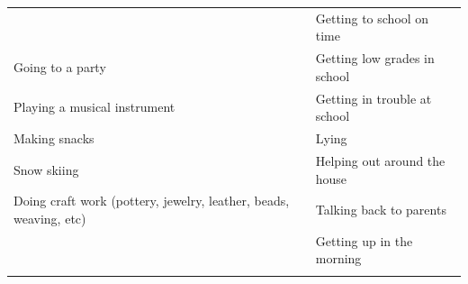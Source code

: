 \documentclass[]{book}
\begin{document}
\begin{longtable}[]{@{}ll@{}}
\begin{minipage}[t]{0.50\columnwidth}
\end{minipage} & \begin{minipage}[t]{0.44\columnwidth}\raggedright
Getting to school on time\strut
\end{minipage}\tabularnewline
\begin{minipage}[t]{0.50\columnwidth}\raggedright
Going to a party\strut
\end{minipage} & \begin{minipage}[t]{0.44\columnwidth}\raggedright
Getting low grades in school\strut
\end{minipage}\tabularnewline
\begin{minipage}[t]{0.50\columnwidth}\raggedright
Playing a musical instrument\strut
\end{minipage} & \begin{minipage}[t]{0.44\columnwidth}\raggedright
Getting in trouble at school\strut
\end{minipage}\tabularnewline
\begin{minipage}[t]{0.50\columnwidth}\raggedright
Making snacks\strut
\end{minipage} & \begin{minipage}[t]{0.44\columnwidth}\raggedright
Lying\strut
\end{minipage}\tabularnewline
\begin{minipage}[t]{0.50\columnwidth}\raggedright
Snow skiing\strut
\end{minipage} & \begin{minipage}[t]{0.44\columnwidth}\raggedright
Helping out around the house\strut
\end{minipage}\tabularnewline
\begin{minipage}[t]{0.50\columnwidth}\raggedright
Doing craft work (pottery, jewelry, leather, beads, weaving, etc)\strut
\end{minipage} & \begin{minipage}[t]{0.44\columnwidth}\raggedright
Talking back to parents\strut
\end{minipage}\tabularnewline
\begin{minipage}[t]{0.50\columnwidth}\raggedright
\strut
\end{minipage} & \begin{minipage}[t]{0.44\columnwidth}\raggedright
Getting up in the morning\strut
\end{minipage}\tabularnewline
\begin{minipage}[t]{0.50\columnwidth}\raggedright
\strut
\end{minipage} & \begin{minipage}[t]{0.44\columnwidth}\raggedright

\end{minipage}
\end{longtable}
\end{document}
